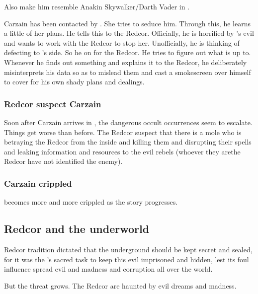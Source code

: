 Also make him resemble Anakin Skywalker/Darth Vader in \cite{Movie:StarWars:III}. 

Carzain has been contacted by \Belzir. 
She tries to seduce him.
Through this, he learns a little of her plans. 
He tells this to the Redcor. 
Officially, he is horrified by \Belzir's evil and wants to work with the Redcor to stop her. 
Unofficially, he is thinking of defecting to \Belzir's side. 
So he  on \Belzir for the Redcor. 
He tries to figure out what \Belzir is up to.
Whenever he finds out something and explains it to the Redcor, he deliberately misinterprets his data so as to mislead them and cast a smokescreen over himself to cover for his own shady plans and dealings. 





\subsubsection{Redcor suspect Carzain}
Soon after Carzain arrives in \Redce, the dangerous occult occurrences seem to escalate. 
Things get worse than before. 
The Redcor suspect that there is a mole who is betraying the Redcor from the inside and killing them and disrupting their spells and leaking information and resources to the evil rebels (whoever they are\dash the Redcor have not identified the enemy).  





\subsubsection{Carzain crippled}
 becomes more and more crippled as the story progresses.









\subsection{Redcor and the underworld}
Redcor tradition dictated that the underground should be kept secret and sealed, for it was the \vclan's sacred task to keep this evil imprisoned and hidden, lest its foul influence spread evil and madness and corruption all over the world. 

But the threat grows. 
The Redcor are haunted by evil dreams and madness. 

